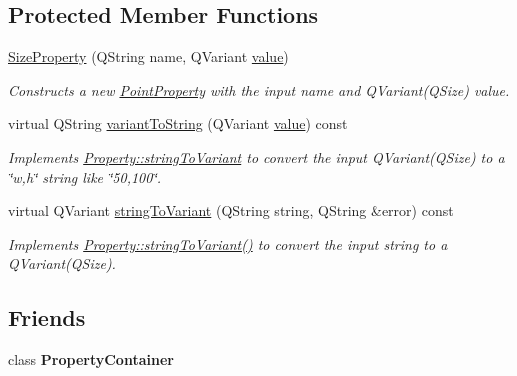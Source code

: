 \subsection*{Protected Member Functions}
\begin{DoxyCompactItemize}
\item 
\hypertarget{class_picto_1_1_size_property_a2f86e9c9e5e7db3a058432eae958aa26}{\hyperlink{class_picto_1_1_size_property_a2f86e9c9e5e7db3a058432eae958aa26}{Size\-Property} (Q\-String name, Q\-Variant \hyperlink{class_picto_1_1_property_a69540c9d4f9a4b0b128b4c6a876d67ca}{value})}\label{class_picto_1_1_size_property_a2f86e9c9e5e7db3a058432eae958aa26}

\begin{DoxyCompactList}\small\item\em Constructs a new \hyperlink{class_picto_1_1_point_property}{Point\-Property} with the input name and Q\-Variant(\-Q\-Size) value. \end{DoxyCompactList}\item 
\hypertarget{class_picto_1_1_size_property_a168414cb81e4327050496c4ac8eac5eb}{virtual Q\-String \hyperlink{class_picto_1_1_size_property_a168414cb81e4327050496c4ac8eac5eb}{variant\-To\-String} (Q\-Variant \hyperlink{class_picto_1_1_property_a69540c9d4f9a4b0b128b4c6a876d67ca}{value}) const }\label{class_picto_1_1_size_property_a168414cb81e4327050496c4ac8eac5eb}

\begin{DoxyCompactList}\small\item\em Implements \hyperlink{class_picto_1_1_property_a97d52011d6db190c5c28a21d76ac1d3b}{Property\-::string\-To\-Variant} to convert the input Q\-Variant(\-Q\-Size) to a \char`\"{}w,h\char`\"{} string like \char`\"{}50,100\char`\"{}. \end{DoxyCompactList}\item 
virtual Q\-Variant \hyperlink{class_picto_1_1_size_property_a4297b95cc75821d0a7e194f8c7827dcc}{string\-To\-Variant} (Q\-String string, Q\-String \&error) const 
\begin{DoxyCompactList}\small\item\em Implements \hyperlink{class_picto_1_1_property_a97d52011d6db190c5c28a21d76ac1d3b}{Property\-::string\-To\-Variant()} to convert the input string to a Q\-Variant(\-Q\-Size). \end{DoxyCompactList}\end{DoxyCompactItemize}
\subsection*{Friends}
\begin{DoxyCompactItemize}
\item 
\hypertarget{class_picto_1_1_size_property_a7ff968ca40027b2b0500a9260b463e3a}{class {\bfseries Property\-Container}}\label{class_picto_1_1_size_property_a7ff968ca40027b2b0500a9260b463e3a}

\end{DoxyCompactItemize}
